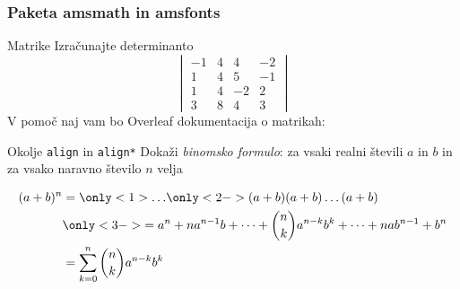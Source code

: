  

\begin{frame}
    \frametitle{Paketa amsmath in amsfonts}
\end{frame}

\begin{frame}{Matrike}
Izračunajte determinanto
    \[
    \begin{vmatrix}
        -1 & 4 & 4 & -2 \\
        1 & 4 & 5 & -1 \\
        1 & 4 & -2 & 2 \\
        3 & 8 & 4 & 3
    \end{vmatrix}
    \]
	V pomoč naj vam bo Overleaf dokumentacija o matrikah:
	\href{https://www.overleaf.com/learn/latex/Matrices}{}
\end{frame}

\begin{frame}{Okolje \texttt{align} in \texttt{align*}}
	Dokaži \emph{binomsko formulo}: za vsaki realni števili $a$ in $b$ in za vsako naravno število $n$ velja
	\begin{flushleft}
		   \begin{align*}
            (a + b)^n &= \only<1>{\dots}
			\only<2->{(a + b)(a + b)\dots(a + b)} \\
            & \only<3->{= a^n + n a^{n-1} b + \dots + \binom{n}{k} a^{n-k} b^k + \dots + n a b^{n-1} + b^n} \\
            &= \sum_{k=0}^n \binom{n}{k} a^{n-k} b^k
        \end{align*}
	\end{flushleft}
	
\end{frame}

